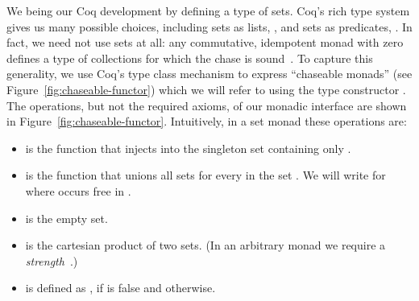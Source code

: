 \documentclass[preprint]{sigplanconf}
\newcommand{\greg}[1]{\textcolor{blue}{GREG: #1}}
\begin{document}

We being our Coq development by defining a type of sets.
 Coq's rich type system gives us many possible choices, including sets as lists, , and sets as predicates, .
In fact, we need not use sets at all: any commutative, idempotent monad with zero defines a type of collections for which the chase is sound~\cite{Popa99anequational}.
To capture this generality, we use Coq's type class mechanism to express ``chaseable monads'' (see Figure~\ref{fig:chaseable-functor}) which we will refer to using the type constructor .
The operations, but not the required axioms, of our monadic interface are shown in Figure~\ref{fig:chaseable-functor}.
Intuitively, in a set monad these operations are:
\begin{itemize}
\item {} is the function that injects  into the singleton set containing only .
\item {} is the function that unions all sets  for every  in the set .  We will write  for  where  occurs free in .
\item {} is the empty set.
\item {} is the cartesian product of two sets.  (In an arbitrary monad we require a {\it strength}~\cite{BW}.)
\item {} is defined as , if  is false and  otherwise.
\end{itemize}
\end{document}
